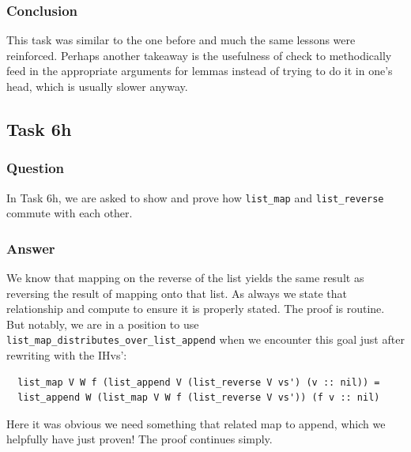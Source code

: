 \documentclass{article}
\begin{document}
\subsubsection{Conclusion}
This task was similar to the one before and much the same lessons were reinforced. Perhaps another takeaway is the usefulness of check to methodically feed in the appropriate arguments for lemmas instead of trying to do it in one's head, which is usually slower anyway.             

\subsection{Task 6h}

\subsubsection{Question}
In Task 6h, we are asked to show and prove how \texttt{list\_map} and \texttt{list\_reverse} commute with each other.

\subsubsection{Answer}
We know that mapping on the reverse of the list yields the same result as reversing the result of mapping onto that list. As always we state that relationship and compute to ensure it is properly stated. The proof is routine. But notably, we are in a position to use \texttt{list\_map\_distributes\_over\_list\_append} when we encounter this goal just after rewriting with the IHvs':

\begin{lstlisting}
  list_map V W f (list_append V (list_reverse V vs') (v :: nil)) =
  list_append W (list_map V W f (list_reverse V vs')) (f v :: nil)
\end{lstlisting}

Here it was obvious we need something that related map to append, which we helpfully have just proven! The proof continues simply. 
\end{document}
